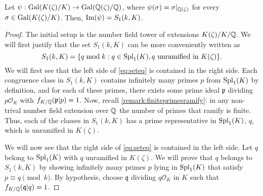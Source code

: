 \documentclass[../main.tex]{subfiles}
\begin{document}
\begin{theorem}\label{th:conrad}
	Let $\psi:\operatorname{Gal}(K(\zeta)/K)\rightarrow \operatorname{Gal}(\mathbb{Q}(\zeta)/\mathbb{Q})$, where $\psi(\sigma)=\sigma|_{\mathbb{Q}(\zeta)}$ for every $\sigma\in\operatorname{Gal}(K(\zeta)/K)$. Then, $\operatorname{Im}(\psi)=S_1(k,K)$. 
\end{theorem}
\begin{proof}
	 The initial setup is the number field tower of extensions $K(\zeta)/K/\mathbb{Q}$. We will first justify that the set $S_1(k,K)$ can be more conveniently written as
	\begin{equation}\label{eq:seteq}
		S_1(k,K)=\{q \bmod{k}: q\in\operatorname{Spl}_1(K), q \ \text{unramified in $K(\zeta)$}\}.
	\end{equation}
	We will first see that the left side of \cref{eq:seteq} is contained in the right side. Each congruence class in $S_1(k,K)$ contains infinitely many primes $p$ from $\operatorname{Spl}_1(K)$ by definition, and for each of these primes, there exists some prime ideal $\mathfrak{p}$ dividing $p\mathcal{O}_K$ with $f_{K/\mathbb{Q}}(\mathfrak{p}|p)=1$. Now, recall \cref{remark:finiteprimesramify}: in any non-trival number field extension over $\mathbb{Q}$ the number of primes that ramify is finite. Thus, each of the classes in $S_1(k,K)$ has a prime representative in $\operatorname{Spl}_1(K)$, $q$, which is unramified in $K(\zeta)$. 
	
	We will now see that the right side of \cref{eq:seteq} is contained in the left side. Let $q$ belong to $\operatorname{Spl}_1(K)$ with $q$ unramified in $K(\zeta)$. We will prove that $q$ belongs to $S_1(k,K)$ by showing infinitely many primes $p$ lying in $\operatorname{Spl}_1(K)$ that satisfy $p\equiv q\pmod{k}$. By hypothesis, choose $\mathfrak{q}$ dividing $q\mathcal{O}_K$ in $K$ such that $f_{K/\mathbb{Q}}(\mathfrak{q}|q)=1$. 
	

\end{proof}
\end{document}
